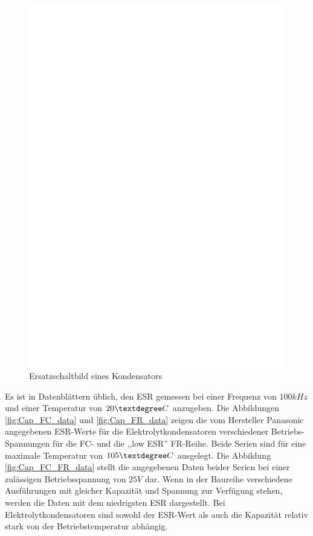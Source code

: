 \begin{figure}[H]
  \centering
    \includegraphics[]{../FIG/Cap_equiv.eps}
  \caption{Ersatzschaltbild eines Kondensators}
  \label{fig:Cap_equiv}
\end{figure}

Es ist in Datenblättern üblich, den ESR gemessen bei einer Frequenz von \(100kHz\) und
einer Temperatur von \(20\textdegree C\) anzugeben.
Die Abbildungen \ref{fig:Cap_FC_data} und \ref{fig:Cap_FR_data} zeigen die vom Hersteller Panasonic 
angegebenen ESR-Werte für die Elektrolytkondensatoren verschiedener Betriebs-Spannungen für die FC- und die ,,low ESR'' FR-Reihe.
Beide Serien sind für eine maximale Temperatur von \(105\textdegree C\) ausgelegt.
Die Abbildung \ref{fig:Cap_FC_FR_data} stellt die angegebenen Daten beider Serien bei einer zulässigen Betriebsspannung
von \(25V\) dar. Wenn in der Baureihe verschiedene Ausführungen mit gleicher Kapazität und Spannung zur Verfügung stehen,
werden die Daten mit dem niedrigsten ESR dargestellt.
Bei Elektrolytkondensatoren sind sowohl der ESR-Wert als auch die Kapazität relativ stark von der Betriebstemperatur
abhängig.

